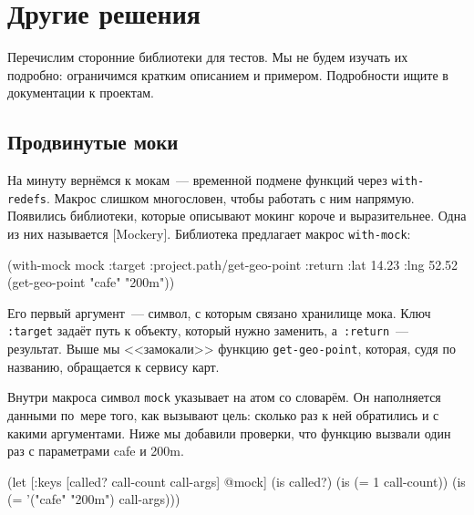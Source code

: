 \section{Другие решения}

Перечислим сторонние библиотеки для тестов. Мы не будем изучать их подробно:
ограничимся кратким описанием и примером. Подробности ищите в документации к
проектам.

\subsection{Продвинутые моки}


На минуту вернёмся к мокам~--- временной подмене функций через
\verb|with-redefs|. Макрос слишком многословен, чтобы работать с ним
напрямую. Появились библиотеки, которые описывают мокинг короче и
выразительнее. Одна из них называется
[Mockery].
Библиотека предлагает макрос \verb|with-mock|:

\begin{english}
  \begin{clojure}
(with-mock mock
  {:target :project.path/get-geo-point
   :return {:lat 14.23 :lng 52.52}}
  (get-geo-point "cafe" "200m"))
  \end{clojure}
\end{english}

Его первый аргумент~--- символ, с которым связано хранилище мока. Ключ
\verb|:target| задаёт путь к объекту, который нужно заменить,
а~\verb|:return|~--- результат. Выше мы <<замокали>> функцию
\verb|get-geo-point|, которая, судя по названию, обращается к сервису карт.

Внутри макроса символ \verb|mock| указывает на атом со словарём. Он наполняется
данными по~мере того, как вызывают цель: сколько раз к ней обратились и с какими
аргументами. Ниже мы добавили проверки, что функцию вызвали один раз с
параметрами cafe и 200m.

\ifnarrow

\begin{english}
  \begin{clojure}
(let [{:keys [called?
              call-count
              call-args]} @mock]
  (is called?)
  (is (= 1 call-count))
  (is (= '("cafe" "200m") call-args)))
  \end{clojure}
\end{english}

